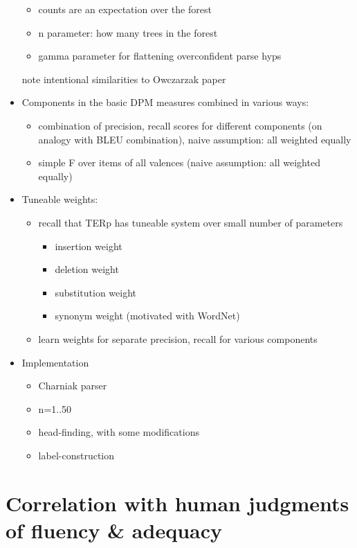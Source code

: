 \documentclass{kluwer}    %
\begin{document}
\begin{article}
\begin{itemize}
  \begin{itemize}
  \item  counts are an expectation over the forest
  \item n parameter: how many trees in the forest
  \item gamma parameter for flattening overconfident parse hyps
  \end{itemize}
  note intentional similarities to Owczarzak paper


\item Components in the basic DPM measures combined in various ways:

  \begin{itemize}
  \item combination of precision, recall scores for different
    components (on analogy with BLEU combination), naive assumption:
    all weighted equally

  \item simple F over items of all valences (naive assumption: all
    weighted equally)
  \end{itemize}
\item Tuneable weights:
  \begin{itemize}
  \item recall that TERp has tuneable system over small number of parameters
    \begin{itemize}
    \item insertion weight
    \item deletion weight
    \item substitution weight
    \item synonym weight (motivated with WordNet)
    \end{itemize}
  \item learn weights for separate precision, recall for various
    components
  \end{itemize}
  
\item Implementation
  \begin{itemize}
  \item Charniak parser
  \item n=1..50
  \item head-finding, with some modifications
  \item label-construction
  \end{itemize}
\end{itemize}

\section{Correlation with human judgments of fluency \& adequacy}


\end{article}
\end{document}
